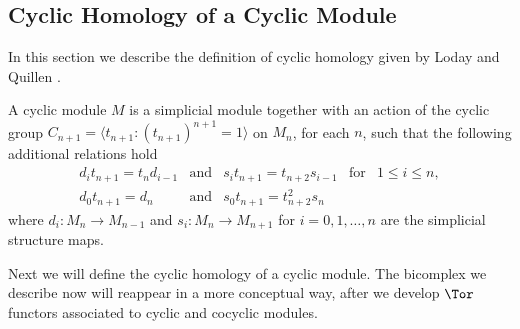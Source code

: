 \subsection{Cyclic Homology of a Cyclic Module}
\hspace{\parindent}
In this section we describe the definition of cyclic homology given by
Loday and Quillen \cite{Lodaybook}.
\begin{defn}
A cyclic module $M$ is a simplicial module together with an action of
the cyclic group
$C_{n+1}=\langle t_{n+1} : (t_{n+1})^{n+1}=1 \rangle$ 
on $M_n$, for each $n$, such that the following additional relations hold
\begin{equation}\label{cyclic_relations}
\begin{array}{lclcl}
d_it_{n+1}=t_{n}d_{i-1} 
        &  \text{and} 
              & s_it_{n+1}=t_{n+2}s_{i-1}     
                        &\text{for} 
                             & 1\leq i\leq n, 
\\
d_0t_{n+1}=d_n            
        & \text{and} 
              &  s_0t_{n+1}=t_{n+2}^2s_n 
                        &           
                              &
\end{array}
\end{equation}
where $d_i \colon M_n\rightarrow M_{n-1}$   
and $s_i \colon M_n \rightarrow M_{n+1}$ for $i=0,1,\dots , n$
are the simplicial structure maps.
\end{defn}

Next we will define the cyclic homology of a cyclic module.
The bicomplex we describe now will reappear in a more conceptual way, after
we develop $\Tor$ functors associated to cyclic and cocyclic modules.


